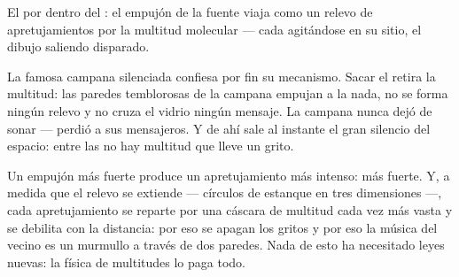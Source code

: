 \begin{omfigure}

{\small El  por dentro del : el empujón de la fuente
viaja como un relevo de apretujamientos por la multitud molecular ---
cada  agitándose en su sitio, el dibujo saliendo disparado.}
\end{omfigure}

\begin{example}\label{ex:g7:sound-production:jar}
La famosa campana silenciada confiesa por fin su mecanismo. Sacar el
 retira la multitud: las paredes temblorosas de la campana
empujan a la nada, no se forma ningún relevo y no cruza el vidrio
ningún mensaje. La campana nunca dejó de sonar --- perdió a sus
mensajeros. Y de ahí sale al instante el gran silencio del espacio:
entre las  no hay multitud que lleve un grito.
\end{example}

\begin{example}\label{ex:g7:sound-production:loud}
Un empujón más fuerte produce un apretujamiento más intenso:
 más fuerte. Y, a medida que el relevo se extiende ---
círculos de estanque en tres dimensiones ---, cada apretujamiento se
reparte por una cáscara de multitud cada vez más vasta y se debilita
con la distancia: por eso se apagan los gritos y por eso la música del
vecino es un murmullo a través de dos paredes. Nada de esto ha
necesitado leyes nuevas: la física de multitudes lo paga todo.
\end{example}


